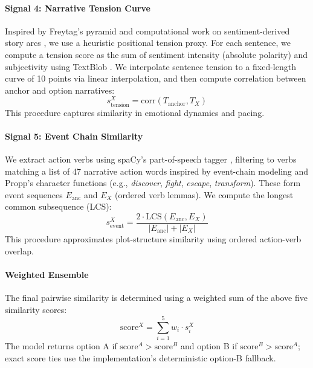 \documentclass[11pt]{article}
\begin{document}
\paragraph{Signal 4: Narrative Tension Curve}
Inspired by Freytag's pyramid \cite{freytag1894technik} and computational work on sentiment-derived story arcs \citep{reagan2016emotionalarcs}, we use a heuristic positional tension proxy. For each sentence, we compute a tension score as the sum of sentiment intensity (absolute polarity) and subjectivity using TextBlob \cite{loria2018textblob}. We interpolate sentence tension to a fixed-length curve of 10 points via linear interpolation, and then compute correlation between anchor and option narratives:
\begin{equation}
s_{\text{tension}}^X = \text{corr}(T_{\text{anchor}}, T_X)
\end{equation}
This procedure captures similarity in emotional dynamics and pacing.

\paragraph{Signal 5: Event Chain Similarity}
We extract action verbs using spaCy's part-of-speech tagger \citep{spacy-2025}, filtering to verbs matching a list of 47 narrative action words inspired by event-chain modeling and Propp's character functions \citep{chambers2008narrativechains,propp1968morphology} (e.g., \emph{discover}, \emph{fight}, \emph{escape}, \emph{transform}). These form event sequences $E_{\text{anc}}$ and $E_X$ (ordered verb lemmas). We compute the longest common subsequence (LCS):
\begin{equation}
s_{\text{event}}^X = \frac{2 \cdot \text{LCS}(E_{\text{anc}}, E_X)}{|E_{\text{anc}}| + |E_X|}
\end{equation}
This procedure approximates plot-structure similarity using ordered action-verb overlap.


\paragraph{Weighted Ensemble}
The final pairwise similarity is determined using a weighted sum of the above five similarity scores:
\begin{equation}
\text{score}^X = \sum_{i=1}^{5} w_i \cdot s_i^X
\end{equation}
The model returns option A if $\text{score}^A > \text{score}^B$ and option B if $\text{score}^B > \text{score}^A$; exact score ties use the implementation's deterministic option-B fallback.
\end{document}
